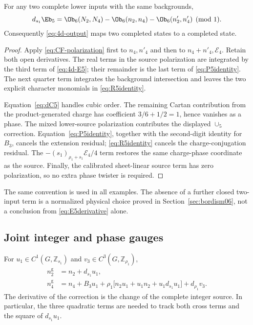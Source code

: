 \begin{theorem}\label{thm:E5}
For any two complete lower inputs with the same backgrounds,
\begin{equation}\label{eq:E5derivative}
 d_{s_1}\Eb_5
 =\Ob_6(N_2,N_4)-\Ob_6(n_2,n_4)-\Ob_6(n'_2,n'_4)
 \pmod1.
\end{equation}
Consequently \eqref{eq:4d-output} maps two completed states to a completed state.
\end{theorem}
\begin{proof}
Apply \eqref{eq:CF-polarization} first to $n_4,n'_4$ and then to $n_4+n'_4,\mathcal E_4$. Retain both open derivatives. The real terms in the source polarization are integrated by the third term of \eqref{eq:4d-E5}; their remainder is the last term of \eqref{eq:P5identity}. The next quarter term integrates the background intersection and leaves the two explicit character monomials in \eqref{eq:R5identity}.

Equation~\eqref{eq:dC5} handles cubic order. The remaining Cartan contribution from the product-generated charge has coefficient $3/6+1/2=1$, hence vanishes as a phase. The mixed lower-source polarization contributes the displayed $\cup_5$ correction. Equation~\eqref{eq:P5identity}, together with the second-digit identity for $B_3$, cancels the extension residual; \eqref{eq:R5identity} cancels the charge-conjugation residual. The $-(s_1)_{\rho_1+s_1}\mathcal E_4/4$ term restores the same charge-phase coordinate as the source. Finally, the calibrated sheet-linear source term has zero polarization, so no extra phase twister is required.
\end{proof}
The same convention is used in all examples. The absence of a further closed two-input term is a normalized physical choice proved in Section~\ref{sec:bordism06}, not a conclusion from \eqref{eq:E5derivative} alone.

\subsection{Joint integer and phase gauges}\label{subsec:gauge4}
For $u_1\in C^1(G,\mathbb Z_{s_1})$ and $v_3\in C^3(G,\mathbb Z_{\rho_1})$,
\begin{equation}\label{eq:4dgauge}
 \boxed{\begin{aligned}
 n_2^{\mathrm g}&=n_2+d_{s_1}u_1,\\
 n_4^{\mathrm g}&=n_4+B_3u_1
 +\rho_1\big[n_2u_1+u_1n_2+u_1d_{s_1}u_1\big]
 +d_{\rho_1}v_3.
 \end{aligned}}
\end{equation}
The derivative of the correction is the change of the complete integer source. In particular, the three quadratic terms are needed to track both cross terms and the square of $d_{s_1}u_1$.

